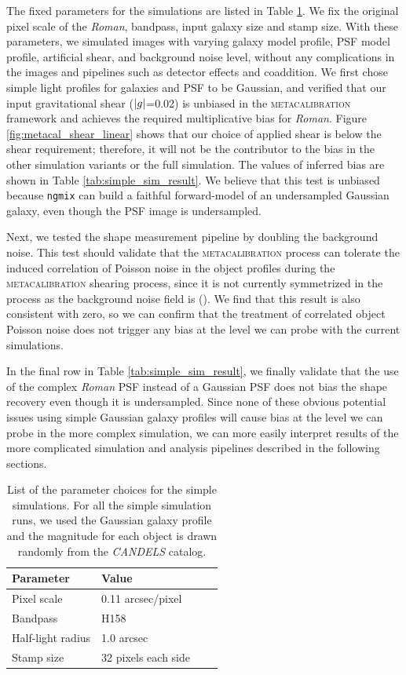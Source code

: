\documentclass[fleqn,usenatbib]{mnras}
\begin{document}
The fixed parameters for the simulations are listed in Table \ref{tab:params}. We fix the original pixel scale of the \emph{Roman}, bandpass, input galaxy size and stamp size. With these parameters, we simulated images with varying galaxy model profile, PSF model profile, artificial shear, and background noise level, without any complications in the images and pipelines such as detector effects and coaddition. We first chose simple light profiles for galaxies and PSF to be Gaussian, and verified that our input gravitational shear ($\abs{g}$=0.02) is unbiased in the \textsc{metacalibration} framework and achieves the required multiplicative bias for \emph{Roman}. Figure \ref{fig:metacal_shear_linear} shows that our choice of applied shear is below the shear requirement; therefore, it will not be the contributor to the bias in the other simulation variants or the full simulation. The values of inferred bias are shown in Table \ref{tab:simple_sim_result}. We believe that this test is unbiased because \texttt{ngmix} can build a faithful forward-model of an undersampled Gaussian galaxy, even though the PSF image is undersampled.

Next, we tested the shape measurement pipeline by doubling the background noise. This test should validate that the \textsc{metacalibration} process can tolerate the induced correlation of Poisson noise in the object profiles during the \textsc{metacalibration} shearing process, since it is not currently symmetrized in the process as the background noise field is (\citealt{2017ApJ...841...24S}). We find that this result is also consistent with zero, so we can confirm that the treatment of correlated object Poisson noise does not trigger any bias at the level we can probe with the current simulations. 

In the final row in Table \ref{tab:simple_sim_result}, we finally validate that the use of the complex \emph{Roman} PSF instead of a Gaussian PSF does not bias the shape recovery even though it is undersampled. Since none of these obvious potential issues using simple Gaussian galaxy profiles will cause bias at the level we can probe in the more complex simulation, we can more easily interpret results of the more complicated simulation and analysis pipelines described in the following sections. 

\begin{table}
    \centering
    \begin{tabular}[width=\columnwidth]{|p{3cm}||p{3cm}|p{3cm}|p{3cm}|}
    \hline
    Parameter & Value \\
    \hline
    Pixel scale & 0.11 arcsec/pixel\\
    Bandpass & H158 \\
    Half-light radius & 1.0 arcsec\\
    Stamp size & 32 pixels each side\\
    \hline
    \end{tabular}
    \caption{List of the parameter choices for the simple simulations. For all the simple simulation runs, we used the Gaussian galaxy profile and the magnitude for each object is drawn randomly from the \emph{CANDELS} catalog. }
    \label{tab:params}
\end{table}
\end{document}
